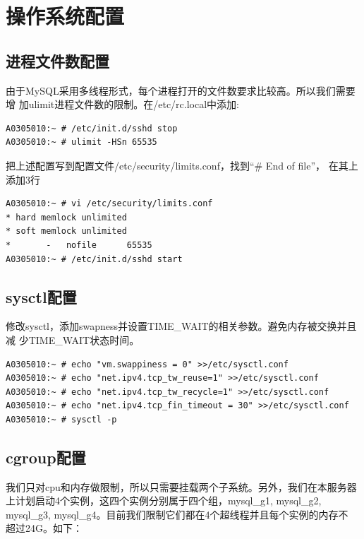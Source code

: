\section{操作系统配置}
\subsection{进程文件数配置}

由于MySQL采用多线程形式，每个进程打开的文件数要求比较高。所以我们需要增
加ulimit进程文件数的限制。在/etc/rc.local中添加:

\begin{verbatim}
A0305010:~ # /etc/init.d/sshd stop
A0305010:~ # ulimit -HSn 65535
\end{verbatim}

把上述配置写到配置文件/etc/security/limits.conf，找到“\# End of file”，
在其上添加3行

\begin{verbatim}
A0305010:~ # vi /etc/security/limits.conf
* hard memlock unlimited
* soft memlock unlimited
*		-	nofile		65535
A0305010:~ # /etc/init.d/sshd start
\end{verbatim}

\subsection{sysctl配置}

修改sysctl，添加swapness并设置TIME\_WAIT的相关参数。避免内存被交换并且减
少TIME\_WAIT状态时间。

\begin{verbatim}
A0305010:~ # echo "vm.swappiness = 0" >>/etc/sysctl.conf
A0305010:~ # echo "net.ipv4.tcp_tw_reuse=1" >>/etc/sysctl.conf
A0305010:~ # echo "net.ipv4.tcp_tw_recycle=1" >>/etc/sysctl.conf
A0305010:~ # echo "net.ipv4.tcp_fin_timeout = 30" >>/etc/sysctl.conf
A0305010:~ # sysctl -p
\end{verbatim}

\subsection{cgroup配置}

我们只对cpu和内存做限制，所以只需要挂载两个子系统。另外，我们在本服务器
上计划启动4个实例，这四个实例分别属于四个组，mysql\_g1, mysql\_g2,
mysql\_g3, mysql\_g4。目前我们限制它们都在4个超线程并且每个实例的内存不
超过24G。如下：


